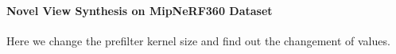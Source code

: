 \paragraph{Novel View Synthesis on MipNeRF360 Dataset}

Here we change the prefilter kernel size and find out the changement of values.

